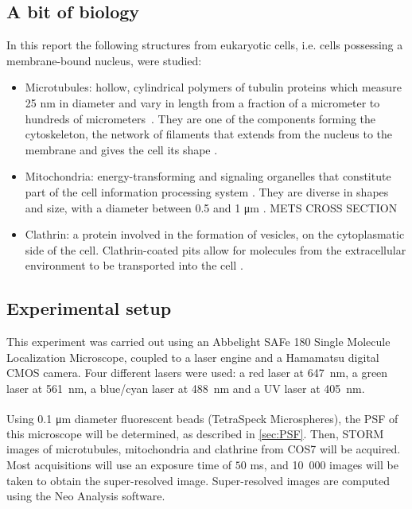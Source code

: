 \subsection{A bit of biology} \label{sec:biology}
In this report the following structures from eukaryotic cells, i.e. cells possessing a membrane-bound nucleus, were studied:
\begin{itemize}
    \item Microtubules: hollow, cylindrical polymers of tubulin proteins which measure 25 nm
    in diameter and vary in length from a fraction of a micrometer to hundreds of \mbox{micrometers \cite{lodish_molecular_2004}.}
    They are one of the components forming the cytoskeleton, the network of filaments that extends from the nucleus to the membrane and gives the cell its shape \cite{douglass_notice_2023}.
    \item Mitochondria: energy-transforming and signaling organelles that constitute part of the cell information processing system \cite{picard_mitochondrial_2022}. They are diverse in shapes and size, with a diameter between 0.5 and 1 \unit{\micro m} \cite{douglass_notice_2023}. METS CROSS SECTION
    \item Clathrin: a protein involved in the formation of vesicles, on the cytoplasmatic side of the cell. 
    Clathrin-coated pits allow for molecules from the extracellular environment to be transported into the cell \cite{douglass_notice_2023}.
\end{itemize}


\subsection{Experimental setup} \label{sec:experimental_setup}
This experiment was carried out using an Abbelight SAFe 180 Single Molecule Localization Microscope, coupled to a laser engine and a Hamamatsu digital CMOS camera. Four different lasers were used: a red laser at \mbox{647 nm}, a green laser at \mbox{561 nm}, a blue/cyan laser at \mbox{488 nm} and a UV laser at \mbox{405 nm}.

Using 0.1 \si{\micro\meter} diameter fluorescent beads (TetraSpeck\textsuperscript{\texttrademark} Microspheres), the PSF of this microscope will be determined, as described in \autoref{sec:PSF}. Then, STORM images of microtubules, mitochondria and clathrine from COS7 will be acquired. Most acquisitions will use an exposure time of $50$ ms, and \mbox{10 000} images will be taken to obtain the super-resolved image. Super-resolved images are computed using the Neo Analysis software.


